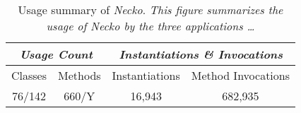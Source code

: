 {\protect
   \begin{table}[t]
   \centering
\footnotesize
      \begin{tabular}{|c|c|c|c|}
         \hline
          \multicolumn{2}{|c|}{\em Usage Count} &
          \multicolumn{2}{|c|}{\em Instantiations \& Invocations} \\
         \hline
         {Classes} & {Methods}  & {Instantiations} & {Method Invocations}  \\
         \hline
         {76/142} & {660/Y} & {16,943}  & {682,935} \\
         \hline
      \end{tabular}
      \caption {Usage summary of {\em Necko}.
\it This figure summarizes the usage of {\em Necko}
by the three applications \dots
}
      \label{tab:neckostats}
\shortline
   \end{table}
}


